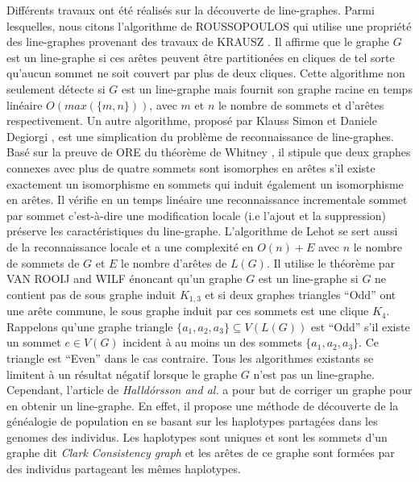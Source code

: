 Diff\'erents travaux ont \'et\'e r\'ealis\'es sur la d\'ecouverte de line-graphes.
Parmi lesquelles, nous citons  l'algorithme de ROUSSOPOULOS \cite{ROUSSOPOULOS1973108} qui utilise une propri\'et\'e des line-graphes provenant des travaux de KRAUSZ \cite{krausz1943demonstration}. 
Il affirme que le graphe $G$ est un line-graphe si ces ar\^etes  peuvent \^etre partition\'ees en cliques  de tel sorte qu'aucun sommet ne soit couvert par plus de deux cliques. 
Cette algorithme non seulement d\'etecte si $G$ est un line-graphe mais fournit son graphe racine en temps lin\'eaire $O(max(\{m,n\}))$, avec $m$ et $n$ le nombre de sommets et d'ar\^etes respectivement.
Un autre algorithme, propos\'e par Klauss Simon et Daniele Degiorgi \cite{decompositionEnCliques}, est une simplication du probl\`eme de reconnaissance de line-graphes. Bas\'e sur la preuve de ORE \cite{ORE} du th\'eor\`eme de Whitney \cite{whitney1932congruent}, il stipule que deux graphes connexes avec plus de quatre sommets sont isomorphes en ar\^etes s'il existe exactement un isomorphisme en sommets qui induit \'egalement un isomorphisme en ar\^etes. Il v\'erifie en un temps lin\'eaire une reconnaissance incrementale  sommet par sommet c'est-\`a-dire une modification locale (i.e l'ajout et la suppression) pr\'eserve les caract\'eristiques du line-graphe.
L'algorithme de Lehot \cite{decompositionEnCliquesParArcs} se sert aussi de la reconnaissance locale et a une complexit\'e en $O(n) + E$ avec $n$ le nombre de sommets de $G$ et $E$ le nombre d'ar\^etes de $L(G)$.
Il utilise le th\'eor\`eme par VAN ROOIJ and WILF \cite{ROOIJetWILF1965interchange} \'enoncant qu'un graphe $G$ est un line-graphe si $G$ ne contient pas de sous graphe induit $K_{1,3}$ et si deux graphes triangles ``Odd'' ont une ar\^ete commune, le sous graphe induit par ces sommets est une clique $K_4$. Rappelons qu'une graphe triangle $\{a_1,a_2,a_3\} \subseteq V(L(G))$ est ``Odd'' s'il existe un sommet $e \in V(G)$ incident \`a  au moins un des sommets $\{a_1, a_2, a_3\}$. Ce triangle est ``Even'' dans le cas contraire. 
\newline
Tous les algorithmes existants se limitent \`a un r\'esultat n\'egatif lorsque le graphe $G$ n'est pas un line-graphe. 
Cependant, l'article de {\em Halld{\'o}rsson and al.} \cite{Halldorsson2013} a pour but de corriger un graphe pour en obtenir un line-graphe. En effet, il propose une m\'ethode de d\'ecouverte de la g\'en\'ealogie de population en se basant sur les haplotypes partag\'ees dans les genomes des individus.  Les haplotypes sont uniques et sont les sommets d'un graphe dit {\em Clark Consistency graph} \cite{halldorsson2011clark} et les ar\^etes de ce graphe sont form\'ees par  des individus partageant les m\^emes haplotypes. 
